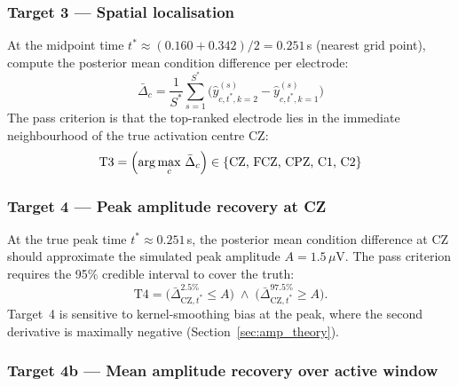 \documentclass[12pt, a4paper]{article}
\begin{document}
\subsubsection*{Target 3 --- Spatial localisation}

At the midpoint time $t^* \approx (0.160 + 0.342)/2 = 0.251$\,s
(nearest grid point), compute the posterior mean condition difference
per electrode:
\begin{equation}
  \bar{\Delta}_c
    = \frac{1}{S^*}\sum_{s=1}^{S^*}
      \bigl(\hat{y}^{(s)}_{c,t^*,k=2} - \hat{y}^{(s)}_{c,t^*,k=1}\bigr)
\end{equation}
The pass criterion is that the top-ranked electrode lies in the immediate
neighbourhood of the true activation centre CZ:
\begin{equation}\label{eq:t3}
  \text{T3} = \Bigl(\arg\max_c\,\bar{\Delta}_c\Bigr)
              \in \{\text{CZ, FCZ, CPZ, C1, C2}\}
\end{equation}

\subsubsection*{Target 4 --- Peak amplitude recovery at CZ}

At the true peak time $t^* \approx 0.251$\,s, the posterior mean
condition difference at CZ should approximate the simulated peak
amplitude $A = 1.5\,\mu\mathrm{V}$. The pass criterion requires the
95\% credible interval to cover the truth:
\begin{equation}\label{eq:t4}
  \text{T4} = \bigl(\bar{\Delta}_{\text{CZ}, t^*}^{2.5\%}
                    \le A\bigr)
            \;\wedge\;
            \bigl(\bar{\Delta}_{\text{CZ}, t^*}^{97.5\%}
                    \ge A\bigr).
\end{equation}
Target~4 is sensitive to kernel-smoothing bias at the peak, where the
second derivative is maximally negative
(Section~\ref{sec:amp_theory}).

\subsubsection*{Target 4b --- Mean amplitude recovery over active window}
\end{document}
